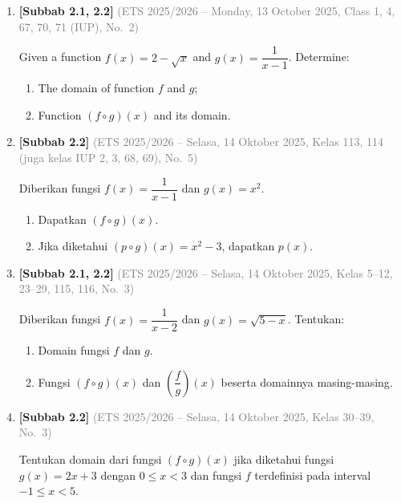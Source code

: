 \documentclass[10pt,openany,a4paper]{article}
\theoremstyle{definition}
\theoremstyle{definition}
\theoremstyle{plain}
\begin{document}
\begin{enumerate}
    \item \textbf{[Subbab 2.1, 2.2]} {\footnotesize\textcolor{gray}{(ETS 2025/2026 -- Monday, 13 October 2025, Class 1, 4, 67, 70, 71 (IUP), No.~2)}}\par
    Given a function $f(x) = 2 - \sqrt{x}$ and $g(x) = \dfrac{1}{x-1}$. Determine:
    \begin{enumerate}
        \item[a)] The domain of function $f$ and $g$;
        \item[b)] Function $(f \circ g)(x)$ and its domain.
    \end{enumerate}

    \item \textbf{[Subbab 2.2]} {\footnotesize\textcolor{gray}{(ETS 2025/2026 -- Selasa, 14 Oktober 2025, Kelas 113, 114 (juga kelas IUP 2, 3, 68, 69), No.~5)}}\par
    Diberikan fungsi $f(x)=\dfrac{1}{x-1}$ dan $g(x)=x^2$.
    \begin{enumerate}
        \item Dapatkan $(f\circ g)(x)$.
        \item Jika diketahui $(p\circ g)(x)=x^2-3$, dapatkan $p(x)$.
    \end{enumerate}

    \item \textbf{[Subbab 2.1, 2.2]} {\footnotesize\textcolor{gray}{(ETS 2025/2026 -- Selasa, 14 Oktober 2025, Kelas 5--12, 23--29, 115, 116, No.~3)}}\par
    Diberikan fungsi $f(x)=\dfrac{1}{x-2}$ dan $g(x)=\sqrt{5-x}$. Tentukan:
    \begin{enumerate}
        \item Domain fungsi $f$ dan $g$.
        \item Fungsi $(f\circ g)(x)$ dan $\left(\dfrac{f}{g}\right) (x)$ beserta domainnya masing-masing.
    \end{enumerate}

    \item \textbf{[Subbab 2.2]} {\footnotesize\textcolor{gray}{(ETS 2025/2026 -- Selasa, 14 Oktober 2025, Kelas 30--39, No.~3)}}\par
    Tentukan domain dari fungsi $(f\circ g)(x)$ jika diketahui fungsi $g(x)=2x+3$ dengan $0\leq x<3$ dan fungsi $f$ terdefinisi pada interval $-1\leq x <5$.

\end{enumerate}
\end{document}
